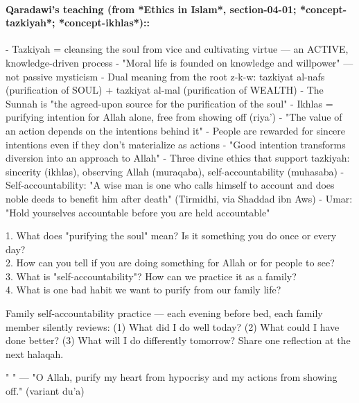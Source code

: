 \documentclass[11pt,a4paper]{article}
\begin{document}
\paragraph*{Qaradawi's teaching (from *Ethics in Islam*, section-04-01; *concept-tazkiyah*; *concept-ikhlas*)::}  - Tazkiyah = cleansing the soul from vice and cultivating virtue --- an ACTIVE, knowledge-driven process - "Moral life is founded on knowledge and willpower" --- not passive mysticism - Dual meaning from the root z-k-w: tazkiyat al-nafs (purification of SOUL) + tazkiyat al-mal (purification of WEALTH) - The Sunnah is "the agreed-upon source for the purification of the soul" - Ikhlas = purifying intention for Allah alone, free from showing off (riya') - "The value of an action depends on the intentions behind it" - People are rewarded for sincere intentions even if they don't materialize as actions - "Good intention transforms diversion into an approach to Allah" - Three divine ethics that support tazkiyah: sincerity (ikhlas), observing Allah (muraqaba), self-accountability (muhasaba) - Self-accountability: "A wise man is one who calls himself to account and does noble deeds to benefit him after death" (Tirmidhi, via Shaddad ibn Aws) - Umar: "Hold yourselves accountable before you are held accountable"

\begin{discussionbox} 1. What does "purifying the soul" mean? Is it something you do once or every day? \\ 2. How can you tell if you are doing something for Allah or for people to see? \\ 3. What is "self-accountability"? How can we practice it as a family? \\ 4. What is one bad habit we want to purify from our family life? \end{discussionbox}

\begin{activitybox} Family self-accountability practice --- each evening before bed, each family member silently reviews: (1) What did I do well today? (2) What could I have done better? (3) What will I do differently tomorrow? Share one reflection at the next halaqah. \end{activitybox}

\begin{duabox} "       " --- "O Allah, purify my heart from hypocrisy and my actions from showing off." (variant du'a) \end{duabox}
\end{document}
